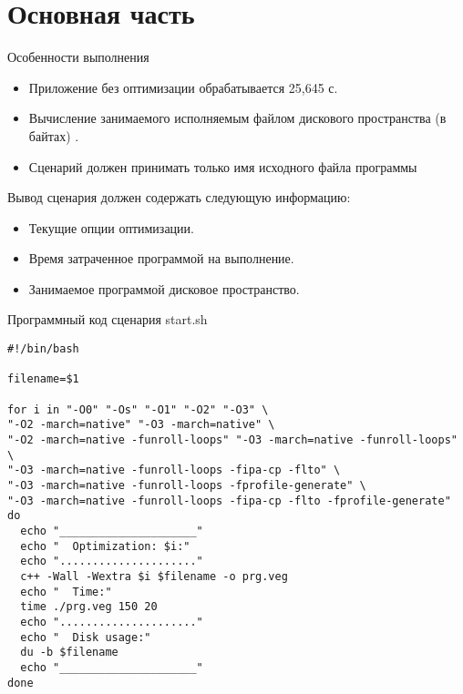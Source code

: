 \documentclass{article}
\begin{document}
\section{Основная часть}
Особенности выполнения
\begin{itemize}
\item Приложение без оптимизации обрабатывается 25,645 с.
\item Вычисление занимаемого исполняемым файлом дискового пространства (в байтах) .
\item Сценарий должен принимать только имя исходного файла программы
\end{itemize}
Вывод сценария должен содержать следующую информацию:
\begin{itemize}
\item Текущие опции оптимизации.
\item Время затраченное программой на выполнение.
\item Занимаемое программой дисковое пространство.
\end{itemize}
Программный код сценария start.sh\\[2mm]
\begin{lstlisting}
#!/bin/bash

filename=$1

for i in "-O0" "-Os" "-O1" "-O2" "-O3" \
"-O2 -march=native" "-O3 -march=native" \
"-O2 -march=native -funroll-loops" "-O3 -march=native -funroll-loops" \
"-O3 -march=native -funroll-loops -fipa-cp -flto" \
"-O3 -march=native -funroll-loops -fprofile-generate" \
"-O3 -march=native -funroll-loops -fipa-cp -flto -fprofile-generate"
do
  echo "_____________________"
  echo "  Optimization: $i:"
  echo "....................."
  c++ -Wall -Wextra $i $filename -o prg.veg
  echo "  Time:"
  time ./prg.veg 150 20
  echo "....................."
  echo "  Disk usage:"
  du -b $filename
  echo "_____________________"
done
\end{lstlisting}
\end{document}
